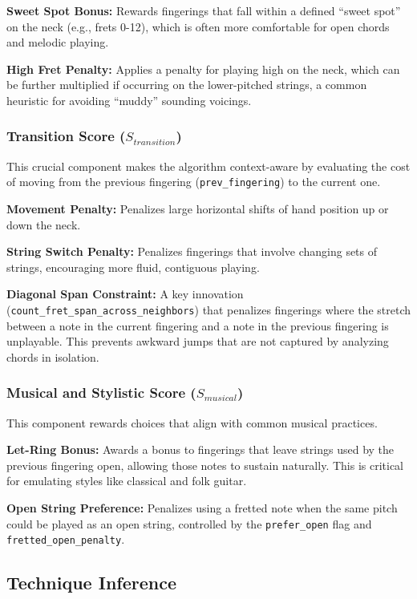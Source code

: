 \documentclass[conference]{IEEEtran}
\begin{document}
\textbf{Sweet Spot Bonus:} Rewards fingerings that fall within a defined ``sweet spot'' on the neck (e.g., frets 0-12), which is often more comfortable for open chords and melodic playing.

\textbf{High Fret Penalty:} Applies a penalty for playing high on the neck, which can be further multiplied if occurring on the lower-pitched strings, a common heuristic for avoiding ``muddy'' sounding voicings.

\subsubsection{Transition Score ($S_{transition}$)}
This crucial component makes the algorithm context-aware by evaluating the cost of moving from the previous fingering (\texttt{prev\_fingering}) to the current one.

\textbf{Movement Penalty:} Penalizes large horizontal shifts of hand position up or down the neck.

\textbf{String Switch Penalty:} Penalizes fingerings that involve changing sets of strings, encouraging more fluid, contiguous playing.

\textbf{Diagonal Span Constraint:} A key innovation (\texttt{count\_fret\_span\_across\_neighbors}) that penalizes fingerings where the stretch between a note in the current fingering and a note in the previous fingering is unplayable. This prevents awkward jumps that are not captured by analyzing chords in isolation.

\subsubsection{Musical and Stylistic Score ($S_{musical}$)}
This component rewards choices that align with common musical practices.

\textbf{Let-Ring Bonus:} Awards a bonus to fingerings that leave strings used by the previous fingering open, allowing those notes to sustain naturally. This is critical for emulating styles like classical and folk guitar.

\textbf{Open String Preference:} Penalizes using a fretted note when the same pitch could be played as an open string, controlled by the \texttt{prefer\_open} flag and \texttt{fretted\_open\_penalty}.

\subsection{Technique Inference}
\end{document}
